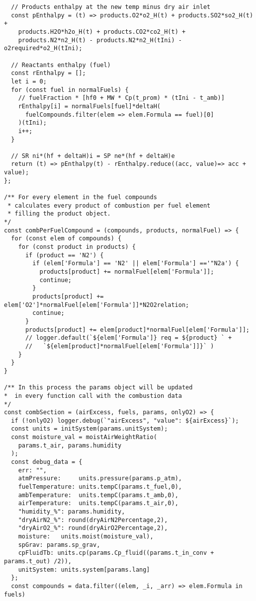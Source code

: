 \begin{verbatim}
  // Products enthalpy at the new temp minus dry air inlet
  const pEnthalpy = (t) => products.O2*o2_H(t) + products.SO2*so2_H(t) +
    products.H2O*h2o_H(t) + products.CO2*co2_H(t) + 
    products.N2*n2_H(t) - products.N2*n2_H(tIni) - o2required*o2_H(tIni);
  
  // Reactants enthalpy (fuel)
  const rEnthalpy = [];
  let i = 0;
  for (const fuel in normalFuels) {
    // fuelFraction * [hf0 + MW * Cp(t_prom) * (tIni - t_amb)]
    rEnthalpy[i] = normalFuels[fuel]*deltaH(
      fuelCompounds.filter(elem => elem.Formula == fuel)[0]
    )(tIni);
    i++;
  }
  
  // SR ni*(hf + deltaH)i = SP ne*(hf + deltaH)e
  return (t) => pEnthalpy(t) - rEnthalpy.reduce((acc, value)=> acc + value);
};

/** For every element in the fuel compounds 
 * calculates every product of combustion per fuel element
 * filling the product object.
*/
const combPerFuelCompound = (compounds, products, normalFuel) => {
  for (const elem of compounds) {
    for (const product in products) {
      if (product == 'N2') {
        if (elem['Formula'] == 'N2' || elem['Formula'] =='"N2a') {
          products[product] += normalFuel[elem['Formula']];
          continue;
        }
        products[product] += elem['O2']*normalFuel[elem['Formula']]*N2O2relation;
        continue;
      }
      products[product] += elem[product]*normalFuel[elem['Formula']];
      // logger.default(`${elem['Formula']} req = ${product} ` +
      //   `${elem[product]*normalFuel[elem['Formula']]}` )
    }
  }
}

/** In this process the params object will be updated
*  in every function call with the combustion data
*/
const combSection = (airExcess, fuels, params, onlyO2) => {
  if (!onlyO2) logger.debug(`"airExcess", "value": ${airExcess}`);
  const units = initSystem(params.unitSystem);
  const moisture_val = moistAirWeightRatio(
    params.t_air, params.humidity
  );
  const debug_data = {
    err: "",
    atmPressure:     units.pressure(params.p_atm),
    fuelTemperature: units.tempC(params.t_fuel,0),
    ambTemperature:  units.tempC(params.t_amb,0),
    airTemperature:  units.tempC(params.t_air,0),
    "humidity_%": params.humidity,
    "dryAirN2_%": round(dryAirN2Percentage,2),
    "dryAirO2_%": round(dryAirO2Percentage,2),
    moisture:   units.moist(moisture_val),
    spGrav: params.sp_grav,
    cpFluidTb: units.cp(params.Cp_fluid((params.t_in_conv + params.t_out) /2)),
    unitSystem: units.system[params.lang]
  };
  const compounds = data.filter((elem, _i, _arr) => elem.Formula in fuels)


\end{verbatim}
